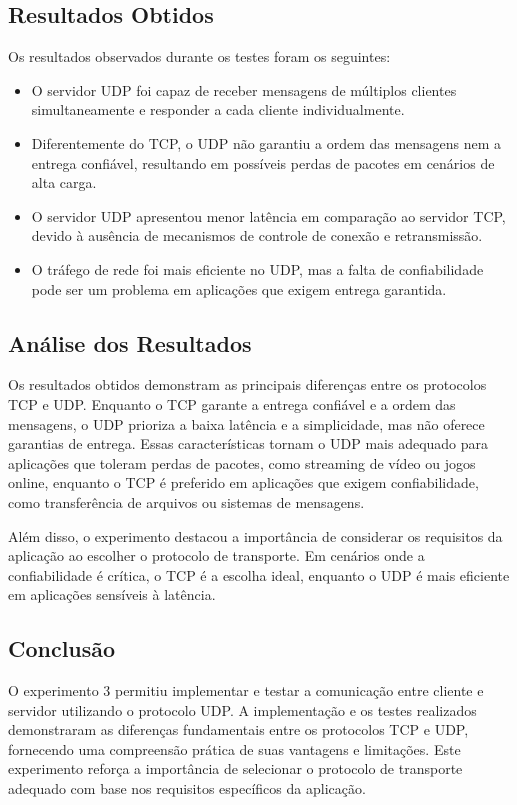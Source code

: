 \subsection*{Resultados Obtidos}

Os resultados observados durante os testes foram os seguintes:
\begin{itemize}
    \item O servidor UDP foi capaz de receber mensagens de múltiplos clientes simultaneamente e responder a cada cliente individualmente.
    \item Diferentemente do TCP, o UDP não garantiu a ordem das mensagens nem a entrega confiável, resultando em possíveis perdas de pacotes em cenários de alta carga.
    \item O servidor UDP apresentou menor latência em comparação ao servidor TCP, devido à ausência de mecanismos de controle de conexão e retransmissão.
    \item O tráfego de rede foi mais eficiente no UDP, mas a falta de confiabilidade pode ser um problema em aplicações que exigem entrega garantida.
\end{itemize}

\subsection*{Análise dos Resultados}

Os resultados obtidos demonstram as principais diferenças entre os protocolos TCP e UDP. Enquanto o TCP garante a entrega confiável e a ordem das mensagens, o UDP prioriza a baixa latência e a simplicidade, mas não oferece garantias de entrega. Essas características tornam o UDP mais adequado para aplicações que toleram perdas de pacotes, como streaming de vídeo ou jogos online, enquanto o TCP é preferido em aplicações que exigem confiabilidade, como transferência de arquivos ou sistemas de mensagens.

Além disso, o experimento destacou a importância de considerar os requisitos da aplicação ao escolher o protocolo de transporte. Em cenários onde a confiabilidade é crítica, o TCP é a escolha ideal, enquanto o UDP é mais eficiente em aplicações sensíveis à latência.

\subsection*{Conclusão}

O experimento 3 permitiu implementar e testar a comunicação entre cliente e servidor utilizando o protocolo UDP. A implementação e os testes realizados demonstraram as diferenças fundamentais entre os protocolos TCP e UDP, fornecendo uma compreensão prática de suas vantagens e limitações. Este experimento reforça a importância de selecionar o protocolo de transporte adequado com base nos requisitos específicos da aplicação.

